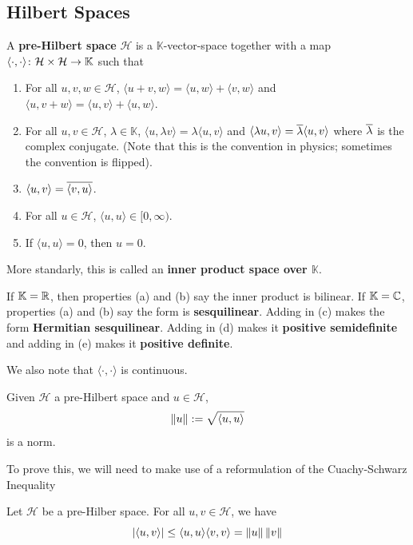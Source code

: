 \documentclass[11pt,leqno,oneside]{amsbook}
\numberwithin{thm}{section}
\newcommand{\K}{\mathbb{K}} %
\renewcommand{\H}{\mathcal{H}} %
\renewcommand{\de}{\textbf} %
\begin{document}
\subsection{Hilbert Spaces}
\begin{defn}
  A \de{pre-Hilbert space} \(\H\) is a \(\K\)-vector-space together
  with a map \(\langle \cdot, \cdot \rangle \from \H \times \H \to
  \K\) such that
  \begin{enumerate}
  \item For all \(u,v,w \in \H\), \(\langle u+v,w \rangle = \langle
    u,w \rangle + \langle v,w \rangle\) and \(\langle u,v+w \rangle =
    \langle u,v \rangle + \langle u,w \rangle\).
  \item For all \(u,v \in \H\), \(\lambda \in \K\), \(\langle u,\lambda
    v\rangle = \lambda \langle u,v \rangle\) and \(\langle \lambda u,
    v \rangle = \ov{\lambda} \langle u,v \rangle\) where
    \(\ov{\lambda}\) is the complex conjugate. (Note that this is the
    convention in physics; sometimes the convention is flipped).
  \item \(\langle u,v \rangle = \ov{\langle  v,u \rangle}\).
  \item For all \(u \in \H\), \(\langle u,u \rangle \in [0,\infty)\).
  \item If \(\langle u,u \rangle = 0\), then \(u = 0\).
  \end{enumerate}
  More standarly, this is called an \de{inner product
    space over \(\K\)}.
\end{defn}
\begin{rmk}
  If \(\K = \R\), then properties (a) and (b) say the inner product is
  bilinear. If \(\K=\C\), properties (a) and (b) say the form is
  \de{sesquilinear}. Adding in (c) makes the form \de{Hermitian
    sesquilinear}. Adding in (d) makes it \de{positive semidefinite}
  and adding in (e) makes it \de{positive definite}.
\end{rmk}
\begin{rmk}
  We also note that \(\langle \cdot,\cdot \rangle\) is continuous.
\end{rmk}
\begin{prop}
  Given \(\H\) a pre-Hilbert space and \(u \in \H\), \[
    \norm[u] := \sqrt{\langle u,u \rangle}
  \]
  is a norm.
\end{prop}
To prove this, we will need to make use of a reformulation of the
Cuachy-Schwarz Inequality
\begin{lem}
  Let \(\H\) be a pre-Hilber space. For all \(u,v \in \H\), we have \[
    \left| \langle u,v \rangle \right| \leq \langle u,u \rangle
    \langle v,v \rangle = \norm[u] \norm[v]
  \]
\end{lem}
\end{document}
